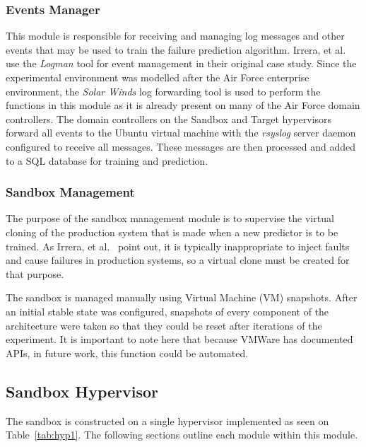 \subsubsection{Events Manager} \label{sec:eventsManagerMgr}
This module is responsible for receiving and managing log messages and other
events that may be used to train the failure prediction algorithm.  Irrera, et
al.~\cite{irrera2015} use the \emph{Logman} tool for event management in their
original case study.  Since the experimental environment was modelled after the
Air Force enterprise environment, the \emph{Solar Winds} log forwarding tool is
used to perform the functions in this module as it is already present on many
of the Air Force domain controllers.  The domain controllers on the Sandbox and
Target hypervisors forward all events to the Ubuntu virtual machine with the
\emph{rsyslog} server daemon configured to receive all messages.  These
messages are then processed and added to a SQL database for training and
prediction.  

\subsubsection{Sandbox Management} \label{sec:sandboxMgr} 
The purpose of the sandbox management module is to supervise the virtual
cloning of the production system that is made when a new predictor is to be
trained.  As Irrera, et al.~\cite{irrera2015,irrera2013} point out, it is
typically inappropriate to inject faults and cause failures in production
systems, so a virtual clone must be created for that purpose.

The sandbox is managed manually using Virtual Machine (VM) snapshots.  After an
initial stable state was configured, snapshots of every component of the
architecture were taken so that they could be reset after iterations of the
experiment.  It is important to note here that because VMWare has documented
APIs, in future work, this function could be automated.

\subsection{Sandbox Hypervisor} \label{sec:sandbox}
The sandbox is constructed on a single hypervisor implemented as seen on
Table~\ref{tab:hyp1}.  The following sections outline each module within this
module.

